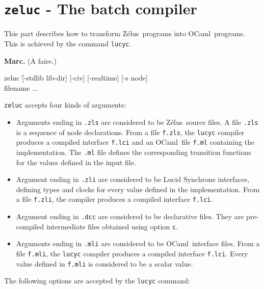 \documentclass[11pt,titlepage,twoside]{report}
\newcommand{\zelus}{{\sf Z\'elus}}
\newcommand{\ocaml}{{\sf OCaml}}
\newcommand{\Marc}[1]{{\bf Marc.} ({#1})}
\begin{document}
\chapter{{\tt zeluc} - The batch compiler}
This part describes how to transform \zelus\ programs into \ocaml\
programs. This is achieved by the command {\tt lucyc}.

\Marc{A faire.}

{\tt \begin{tabbing}
   zeluc \= [-stdlib lib-dir]
                 [-civ]
                 [-realtime]
                 [-s node] \\
          filename ...
\end{tabbing}
}


\noindent
\verb-zeluc- accepts four kinds of arguments: 

\begin{itemize}
\item
Arguments ending in \verb-.zls- are considered to be \zelus\ source
files. A file \verb-.zls- is a sequence of node declarations. From a
file \verb-f.zls-, the \verb-lucyc- compiler produces a compiled
interface \verb-f.lci- and an \ocaml\ file \verb-f.ml- containing the
implementation. The \verb-.ml- file defines the corresponding
transition functions for the values defined in the input file.
\item
Argument ending in \verb-.zli- are considered to be Lucid Synchrone
interfaces, defining types and clocks for every value defined in the
implementation. From a file \verb-f.zli-, 
the compiler produces a compiled interface
\verb-f.lci-.
\item
Argument ending in \verb-.dcc-
are considered to be declarative
files. They are pre-compiled intermediate files obtained using
option \verb-c-.
\item
Arguments ending in \verb-.mli- are considered to be \ocaml\
interface files. From a file \verb-f.mli-, the 
\verb-lucyc- compiler produces a compiled interface \verb-f.lci-.
Every value defined in \verb-f.mli- is considered to be a scalar value.
\end{itemize}

The following options are accepted by the \verb-lucyc- command:
\end{document}
